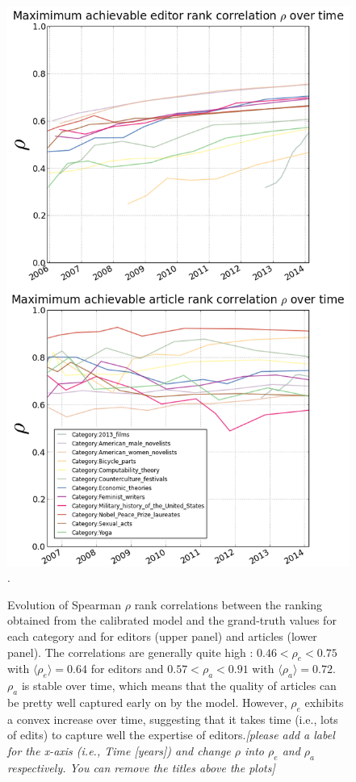 \begin{figure}[!t]
\centering
\includegraphics[width=0.9\columnwidth]{Figures/rho_combined.png}.
\caption{Evolution of Spearman $\rho$ rank correlations between the ranking obtained from the calibrated model and the grand-truth values for each category and for editors (upper panel)  and articles (lower panel). The correlations are generally quite high : $ 0.46 < \rho_e < 0.75$ with $\langle \rho_e\rangle = 0.64$ for editors and $0.57 < \rho_a < 0.91$ with $\langle \rho_a\rangle = 0.72$. $\rho_{a}$  is stable over time, which means that the quality of articles can be pretty well captured early on by the model. However, $\rho_e$ exhibits a convex increase over time, suggesting that it takes time (i.e., lots of edits) to capture well the expertise of editors.{\it [please add a label for the x-axis (i.e., Time [years]) and change $\rho$ into $\rho_e$ and $\rho_a$ respectively. You can remove the titles above the  plots]}}
\label{fig:rhotime}
\end{figure}

